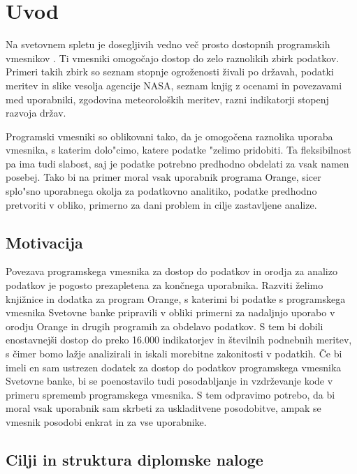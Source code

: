 
\chapter{Uvod}

Na svetovnem spletu je dosegljivih vedno več prosto dostopnih programskih
vmesnikov .
Ti vmesniki omogočajo dostop
do zelo raznolikih zbirk podatkov. Primeri takih zbirk so
seznam stopnje ogroženosti živali po državah,
podatki meritev in slike vesolja agencije NASA,
seznam knjig z ocenami in povezavami med uporabniki,
zgodovina meteoroloških meritev,
razni indikatorji stopenj razvoja držav.
    

Programski vmesniki so oblikovani tako, da je omogočena raznolika uporaba
vmesnika, s katerim dolo"cimo, katere podatke "zelimo pridobiti.
Ta fleksibilnost pa ima tudi slabost, saj je 
podatke potrebno predhodno obdelati za vsak namen posebej. Tako bi na primer 
moral vsak uporabnik programa Orange, sicer splo"sno uporabnega okolja za 
podatkovno analitiko, podatke predhodno pretvoriti v obliko, 
primerno za dani problem in cilje zastavljene analize.


\section{Motivacija}

Povezava programskega vmesnika za dostop do podatkov in orodja za analizo 
podatkov je pogosto prezapletena za končnega uporabnika. Razviti želimo
knjižnice in dodatka za program Orange, s katerimi bi podatke s programskega
vmesnika Svetovne banke pripravili v obliki primerni za nadaljnjo
uporabo v orodju Orange in drugih programih za obdelavo podatkov. S tem bi
dobili enostavnejši dostop do preko 16.000 indikatorjev in številnih podnebnih
meritev, s čimer bomo lažje analizirali in iskali morebitne zakonitosti v
podatkih. Če bi imeli en sam ustrezen dodatek za dostop do podatkov
programskega vmesnika Svetovne banke, bi se poenostavilo tudi posodabljanje in
vzdrževanje kode v primeru sprememb programskega vmesnika. S tem odpravimo
potrebo, da bi moral vsak uporabnik sam skrbeti za uskladitvene posodobitve,
ampak se vmesnik posodobi enkrat in za vse uporabnike.


\section{Cilji in struktura diplomske naloge}

